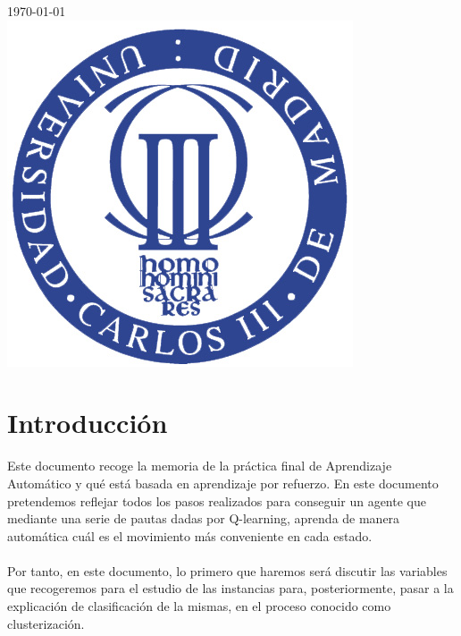 \documentclass[11pt,a4paper]{article}
\begin{document}
\begin{titlepage}
{\large \today}\\[2cm] %


\includegraphics[scale=1]{images/logo.jpg} \\[1cm] %
 

\vfill %

\end{titlepage}

\tableofcontents
\newpage

\section{Introducción}
Este documento recoge la memoria de la práctica final de Aprendizaje Automático y qué está basada en aprendizaje por refuerzo.
En este documento pretendemos reflejar todos los pasos realizados para conseguir un agente que mediante una serie de pautas dadas por Q-learning, aprenda de manera automática cuál es el movimiento más conveniente en cada estado.

\paragraph{}
Por tanto, en este documento, lo primero que haremos será discutir las variables que recogeremos para el estudio de las instancias para, posteriormente, pasar a la explicación de clasificación de la mismas, en el proceso conocido como clusterización.
\end{document}
